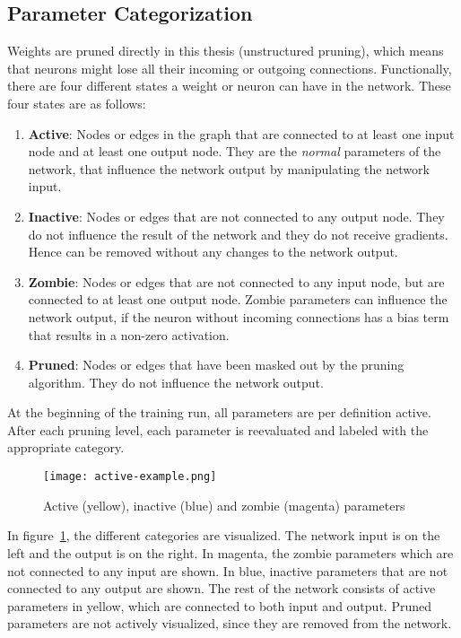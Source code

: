 \subsection{Parameter Categorization}
Weights are pruned directly in this thesis (unstructured pruning), which means that neurons might lose all their incoming or outgoing connections. 
Functionally, there are four different states a weight or neuron can have in the network.
These four states are as follows:
\begin{enumerate}
\item \textbf{Active}: Nodes or edges in the graph that are connected to at least one input node and at least one output node. They are the \textit{normal} parameters of the network, that influence the network output by manipulating the network input.
\item \textbf{Inactive}: Nodes or edges that are not connected to any output node. They do not influence the result of the network and they do not receive gradients. Hence can be removed without any changes to the network output.
\item \textbf{Zombie}: Nodes or edges that are not connected to any input node, but are connected to at least one output node. Zombie parameters can influence the network output, if the neuron without incoming connections has a bias term that results in a non-zero activation.
\item \textbf{Pruned}: Nodes or edges that have been masked out by the pruning algorithm. They do not influence the network output.
\end{enumerate}

At the beginning of the training run, all parameters are per definition active.
After each pruning level, each parameter is reevaluated and labeled with the appropriate category.

\begin{figure}[ht] %
    \centering
    \texttt{[image: active-example.png]}
    \caption{
        Active (yellow), inactive (blue) and zombie (magenta) parameters
    }\label{fig:parameter_categories}
\end{figure}

In figure~\ref{fig:parameter_categories}, the different categories are visualized.
The network input is on the left and the output is on the right.
In magenta, the zombie parameters which are not connected to any input are shown.
In blue, inactive parameters that are not connected to any output are shown.
The rest of the network consists of active parameters in yellow, which are connected to both input and output.
Pruned parameters are not actively visualized, since they are removed from the network.

